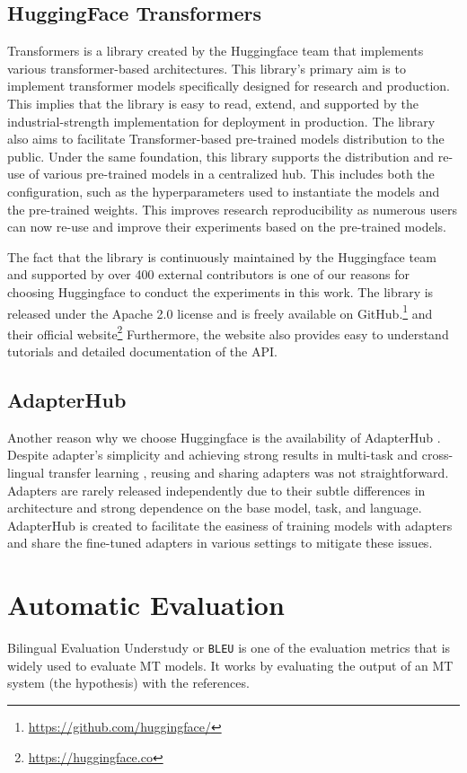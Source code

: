 \subsection{HuggingFace Transformers}
Transformers  is a library created by the Huggingface team that implements various transformer-based architectures. This library's primary aim is to implement transformer models specifically designed for research and production. This implies that the library is easy to read, extend, and supported by the industrial-strength implementation for deployment in production. The library also aims to facilitate Transformer-based pre-trained models distribution to the public. Under the same foundation, this library supports the distribution and re-use of various pre-trained models in a centralized hub. This includes both the configuration, such as the hyperparameters used to instantiate the models and the pre-trained weights. This improves research reproducibility as numerous users can now re-use and improve their experiments based on the pre-trained models.

The fact that the library is continuously maintained by the Huggingface team and supported by over 400 external contributors is one of our reasons for choosing Huggingface to conduct the experiments in this work. The library is released under the Apache 2.0 license and is freely available on GitHub.\footnote{\url{https://github.com/huggingface/}} and their official website\footnote{\url{https://huggingface.co}} Furthermore, the website also provides easy to understand tutorials and detailed documentation of the API.

\subsection{AdapterHub}
Another reason why we choose Huggingface is the availability of AdapterHub . Despite adapter's simplicity and achieving strong results in multi-task and cross-lingual transfer learning , reusing and sharing adapters was not straightforward. Adapters are rarely released independently due to their subtle differences in architecture and strong dependence on the base model, task, and language. AdapterHub is created to facilitate the easiness of training models with adapters and share the fine-tuned adapters in various settings to mitigate these issues.

\section{Automatic Evaluation}
\label{sec:aeval}
Bilingual Evaluation Understudy or \texttt{BLEU}  is one of the evaluation metrics that is widely used to evaluate MT models. It works by evaluating the output of an MT system (the hypothesis) with the references.

